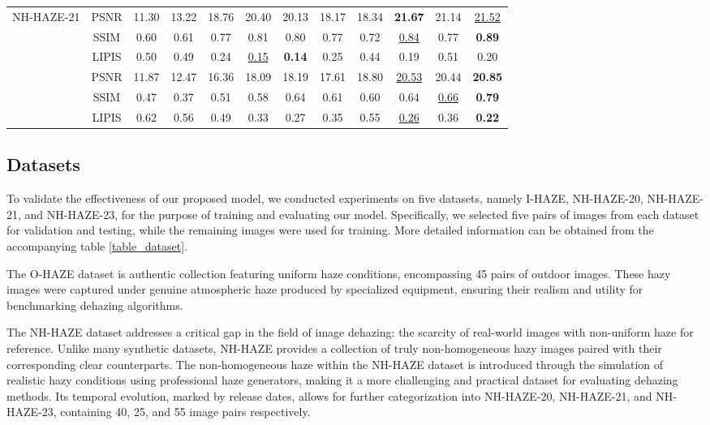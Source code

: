 \documentclass[lettersize,journal]{IEEEtran}
\begin{document}
\begin{table}
\begin{center}
{\begin{tabular}{ c | c | c | c | c | c | c | c | c | c | c | c }
				\multirow{4}{*}{NH-HAZE-21} & PSNR & 11.30 & 13.22 & 18.76 & 20.40 & 20.13 & 18.17 & 18.34 & \textbf{21.67} & 21.14 & \underline{21.52} \\
				& SSIM & 0.60 & 0.61 & 0.77 & 0.81 & 0.80 & 0.77 & 0.72 & \underline{0.84} & 0.77 & \textbf{0.89} \\
				& LIPIS & 0.50 & 0.49 & 0.24 & \underline{0.15} & \textbf{0.14} & 0.25 & 0.44 & 0.19 & 0.51 & 0.20 \\
				\hline
				
				\multirow{4}{*}{NH-HAZE-23} & PSNR & 11.87 & 12.47 & 16.36 & 18.09 & 18.19 & 17.61 & 18.80 & \underline{20.53} & 20.44 & \textbf{20.85} \\
				& SSIM & 0.47 & 0.37 & 0.51 & 0.58 & 0.64 & 0.61 & 0.60 & 0.64 & \underline{0.66} & \textbf{0.79} \\
				& LIPIS & 0.62 & 0.56 & 0.49 & 0.33 & 0.27 & 0.35 & 0.55 & \underline{0.26} & 0.36 & \textbf{0.22} \\
				\hline			
			\end{tabular}
		}
		
	\end{center}
\end{table}

\subsection{Datasets}
To validate the effectiveness of our proposed model, we conducted experiments on five datasets, namely I-HAZE\cite{ancuti2018ihaze}, NH-HAZE-20\cite{ancuti2020ntire}, NH-HAZE-21\cite{ancuti2021ntire}, and NH-HAZE-23\cite{ancuti2023ntire}, for the purpose of training and evaluating our model. Specifically, we selected five pairs of images from each dataset for validation and testing, while the remaining images were used for training. More detailed information can be obtained from the accompanying table \ref{table_dataset}.

The O-HAZE dataset is authentic collection featuring uniform haze conditions, encompassing 45 pairs of outdoor images. These hazy images were captured under genuine atmospheric haze produced by specialized equipment, ensuring their realism and utility for benchmarking dehazing algorithms.

The NH-HAZE dataset addresses a critical gap in the field of image dehazing: the scarcity of real-world images with non-uniform haze for reference. Unlike many synthetic datasets, NH-HAZE provides a collection of truly non-homogeneous hazy images paired with their corresponding clear counterparts. The non-homogeneous haze within the NH-HAZE dataset is introduced through the simulation of realistic hazy conditions using professional haze generators, making it a more challenging and practical dataset for evaluating dehazing methods. Its temporal evolution, marked by release dates, allows for further categorization into NH-HAZE-20, NH-HAZE-21, and NH-HAZE-23, containing 40, 25, and 55 image pairs respectively.
\end{document}

